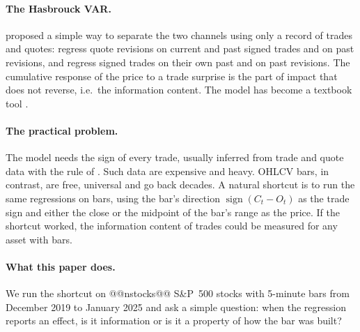 \documentclass[11pt,a4paper]{article}
\begin{document}
\paragraph{The Hasbrouck VAR.} \citet{hasbrouck1991} proposed a simple way to separate the two channels
using only a record of trades and quotes: regress quote revisions on current and past signed trades
and on past revisions, and regress signed trades on their own past and on past revisions. The
cumulative response of the price to a trade surprise is the part of impact that does not reverse, i.e.\
the information content. The model has become a textbook tool \citep{hasbrouck2007}.

\paragraph{The practical problem.} The model needs the sign of every trade, usually inferred from
trade and quote data with the rule of \citet{lee1991}. Such data are expensive and heavy. OHLCV bars,
in contrast, are free, universal and go back decades. A natural shortcut is to run the same
regressions on bars, using the bar's direction $\operatorname{sign}(C_t-O_t)$ as the trade sign and
either the close or the midpoint of the bar's range as the price. If the shortcut worked, the
information content of trades could be measured for any asset with bars.

\paragraph{What this paper does.} We run the shortcut on @@nstocks@@ S\&P~500 stocks with 5-minute bars
from December 2019 to January 2025 and ask a simple question: when the regression reports an effect,
is it information or is it a property of how the bar was built?
\end{document}
